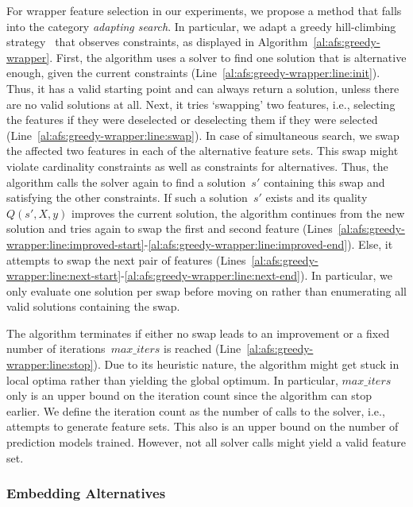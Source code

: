 \documentclass{article}
\theoremstyle{definition}
\begin{document}
For wrapper feature selection in our experiments, we propose a method that falls into the category \emph{adapting search}.
In particular, we adapt a greedy hill-climbing strategy~\cite{kohavi1997wrappers} that observes constraints, as displayed in Algorithm~\ref{al:afs:greedy-wrapper}.
First, the algorithm uses a solver to find one solution that is alternative enough, given the current constraints (Line~\ref{al:afs:greedy-wrapper:line:init}).
Thus, it has a valid starting point and can always return a solution, unless there are no valid solutions at all.
Next, it tries `swapping' two features, i.e., selecting the features if they were deselected or deselecting them if they were selected (Line~\ref{al:afs:greedy-wrapper:line:swap}).
In case of simultaneous search, we swap the affected two features in each of the alternative feature sets.
This swap might violate cardinality constraints as well as constraints for alternatives.
Thus, the algorithm calls the solver again to find a solution~$s'$ containing this swap and satisfying the other constraints.
If such a solution~$s'$ exists and its quality~$Q(s',X,y)$ improves the current solution, the algorithm continues from the new solution and tries again to swap the first and second feature (Lines~\ref{al:afs:greedy-wrapper:line:improved-start}-\ref{al:afs:greedy-wrapper:line:improved-end}).
Else, it attempts to swap the next pair of features (Lines~\ref{al:afs:greedy-wrapper:line:next-start}-\ref{al:afs:greedy-wrapper:line:next-end}).
In particular, we only evaluate one solution per swap before moving on rather than enumerating all valid solutions containing the swap.

The algorithm terminates if either no swap leads to an improvement or a fixed number of iterations~$max\_iters$ is reached (Line~\ref{al:afs:greedy-wrapper:line:stop}).
Due to its heuristic nature, the algorithm might get stuck in local optima rather than yielding the global optimum.
In particular, $max\_iters$ only is an upper bound on the iteration count since the algorithm can stop earlier.
We define the iteration count as the number of calls to the solver, i.e., attempts to generate feature sets.
This also is an upper bound on the number of prediction models trained.
However, not all solver calls might yield a valid feature set.

\subsubsection{Embedding Alternatives}
\label{sec:afs:approach:objectives:embedding}
\end{document}
